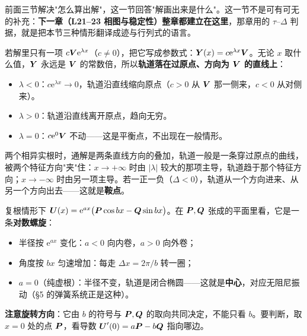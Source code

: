 \documentclass[11pt]{ctexart}
\begin{document}

前面三节解决"怎么算出解"，这一节回答"解画出来是什么"。这一节不是可有可无的补充：\textbf{下一章（L21--23 相图与稳定性）整章都建立在这里}，那章用的 $\tau$--$\Delta$ 判据，就是把本节三种情形翻译成迹与行列式的语言。


若解里只有一项 $c\boldsymbol{V}\mathrm{e}^{\lambda x}$（$c\neq0$），把它写成参数式：$\boldsymbol{Y}(x)=c\mathrm{e}^{\lambda x}\boldsymbol{V}$。无论 $x$ 取什么值，$\boldsymbol{Y}$ 永远是 $\boldsymbol{V}$ 的常数倍，所以\textbf{轨道落在过原点、方向为 $\boldsymbol{V}$ 的直线上}：

\begin{itemize}
  \item $\lambda<0$：$c\mathrm{e}^{\lambda x}\to0$，轨道沿直线缩向原点（$c>0$ 从 $\boldsymbol{V}$ 那一侧来，$c<0$ 从对侧来）。
  \item $\lambda>0$：轨道沿直线离开原点，趋向无穷。
  \item $\lambda=0$：$c\mathrm{e}^{0}\boldsymbol{V}$ 不动——这是平衡点，不出现在一般情形。
\end{itemize}

两个相异实根时，通解是两条直线方向的叠加，轨道一般是一条穿过原点的曲线，被两个特征方向"夹"住：$x\to+\infty$ 时由 $|\lambda|$ 较大的那项主导，轨道趋于那个特征方向；$x\to-\infty$ 时由另一项主导。若一正一负（$\Delta<0$），轨道从一个方向进来、从另一个方向出去——这就是\textbf{鞍点}。


复根情形下 $\boldsymbol{U}(x)=\mathrm{e}^{ax}\bigl(\boldsymbol{P}\cos bx-\boldsymbol{Q}\sin bx\bigr)$。在 $\boldsymbol{P},\boldsymbol{Q}$ 张成的平面里看，它是一条\textbf{对数螺旋}：

\begin{itemize}
  \item 半径按 $\mathrm{e}^{ax}$ 变化：$a<0$ 向内卷，$a>0$ 向外卷；
  \item 角度按 $bx$ 匀速增加：每走 $\Delta x=2\pi/b$ 转一圈；
  \item $a=0$（纯虚根）：半径不变，轨道是闭合椭圆——这就是\textbf{中心}，对应无阻尼振动（§5 的弹簧系统正是这种）。
\end{itemize}

\textbf{注意旋转方向}：它由 $b$ 的符号与 $\boldsymbol{P},\boldsymbol{Q}$ 的取向共同决定，不能只看 $b$。要判断，取 $x=0$ 处的点 $\boldsymbol{P}$，看导数 $\boldsymbol{U}'(0)=a\boldsymbol{P}-b\boldsymbol{Q}$ 指向哪边。
\end{document}
